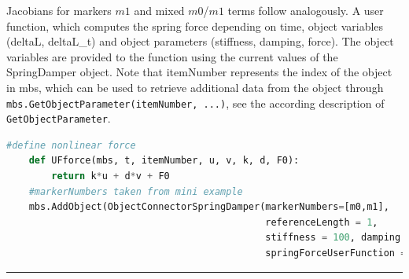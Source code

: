     Jacobians for markers $m1$ and mixed $m0$/$m1$ terms follow analogously.
    A user function, which computes the spring force depending on time, object variables (deltaL, deltaL\_t) and 
    object parameters (stiffness, damping, force).
    The object variables are provided to the function using the current values of the SpringDamper object.
    Note that itemNumber represents the index of the object in mbs, which can be used to retrieve additional data from the object through
    \texttt{mbs.GetObjectParameter(itemNumber, ...)}, see the according description of \texttt{GetObjectParameter}.
    \finishTable
    \userFunctionExample{}
    \pythonstyle
    \begin{lstlisting}[language=Python]
    #define nonlinear force
    def UFforce(mbs, t, itemNumber, u, v, k, d, F0): 
        return k*u + d*v + F0
    #markerNumbers taken from mini example
    mbs.AddObject(ObjectConnectorSpringDamper(markerNumbers=[m0,m1],
                                              referenceLength = 1, 
                                              stiffness = 100, damping = 1,
                                              springForceUserFunction = UFforce))
    \end{lstlisting} \vspace{12pt}
\vspace{6pt}\par\noindent\rule{\textwidth}{0.4pt}
\label{miniExample_ObjectConnectorSpringDamper}
